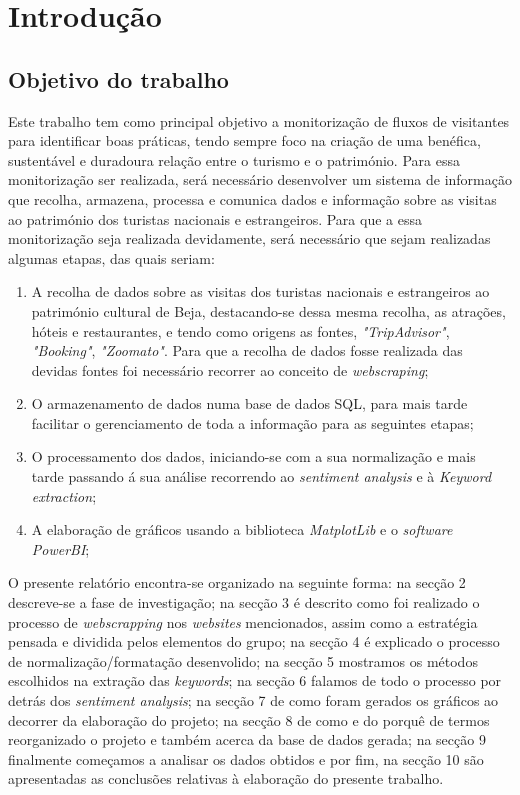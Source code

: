 \chapter{Introdução}
\label{intro}


\section{Objetivo do trabalho}
Este trabalho tem como principal objetivo a monitorização de fluxos de visitantes para identificar boas práticas, tendo sempre foco na criação de uma benéfica, sustentável e duradoura relação entre o turismo e o património. Para essa monitorização ser realizada, será necessário desenvolver um sistema de informação que recolha, armazena, processa e comunica dados e informação sobre as visitas ao património dos turistas nacionais e estrangeiros. Para que a essa monitorização seja realizada devidamente, será necessário que sejam realizadas algumas etapas, das quais seriam:

\begin{enumerate}
    \item A recolha de dados sobre as visitas dos turistas nacionais e estrangeiros ao património cultural de Beja, destacando-se dessa mesma recolha, as atrações, hóteis e restaurantes, e tendo como origens as fontes,  \textit{  "TripAdvisor"}, \textit{  "Booking"}, \textit{  "Zoomato"}. Para que a recolha de dados fosse realizada das devidas fontes foi necessário recorrer ao conceito de \textit{  webscraping};
    \item O armazenamento de dados numa base de dados SQL, para mais tarde facilitar o gerenciamento de toda a informação para as seguintes etapas;
    \item O processamento dos dados, iniciando-se com a sua normalização e mais tarde passando á sua análise recorrendo ao \textit{  sentiment analysis} e à \textit{Keyword extraction};
    \item A elaboração de gráficos usando a biblioteca \textit{  MatplotLib} e o \textit{  software PowerBI};
\end{enumerate} 

O presente relatório encontra-se organizado na seguinte forma: na secção 2 descreve-se a fase de investigação; na secção 3 é descrito como foi realizado o processo de \textit{webscrapping} nos \textit{websites} mencionados, assim como a estratégia pensada e dividida pelos elementos do grupo; na secção 4 é explicado o processo de normalização/formatação desenvolido; na secção 5 mostramos os métodos escolhidos na extração das \textit{keywords}; na secção 6 falamos de todo o processo por detrás dos \textit{sentiment analysis}; na secção 7 de como foram gerados os gráficos ao decorrer da elaboração do projeto; na secção 8 de como e do porquê de termos reorganizado o projeto e também acerca da base de dados gerada; na secção 9 finalmente começamos a analisar os dados obtidos e por fim, na secção 10 são apresentadas as conclusões relativas à elaboração do presente trabalho. 

